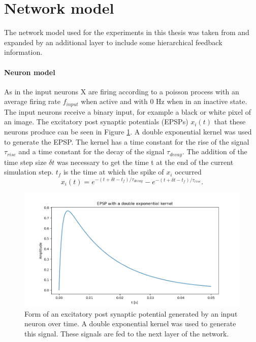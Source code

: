 \section{Network model}

The network model used for the experiments in this thesis was taken from \citet{nessler} and expanded by an additional layer to include some hierarchical feedback information.

\paragraph{Neuron model}
As in \citet{nessler} the input neurons X are firing according to a poisson process with an average firing rate $f_{input}$ when active and with 0 Hz when in an inactive state. The input neurons receive a binary input, for example a black or white pixel of an image. The excitatory post synaptic potentials (EPSPs) $x_i(t)$ that these neurons produce can be seen in Figure \ref{fig:XSpike}. A double exponential kernel was used to generate the EPSP. The kernel has a time constant for the rise of the signal $\tau_{rise}$  and a time constant for the decay of the signal $\tau_{decay}$. The addition of the time step size $\delta t$ was necessary to get the time t at the end of the current simulation step. $t_f$ is the time at which the spike of $x_i$ occurred
\begin{equation}
\label{eqn:EPSP}
x_i(t) = e^{-(t + \delta t - t_f) / \tau_{decay}} - e^{-(t + \delta t - t_f) / \tau_{rise}}.
\end{equation}

\begin{figure}
  \includegraphics[width=\linewidth]{figures/XSpike.png}
  \caption{Form of an excitatory post synaptic potential generated by an input neuron over time. A double exponential kernel was used to generate this signal. These signals are fed to the next layer of the network. }
  \label{fig:XSpike}
\end{figure}

